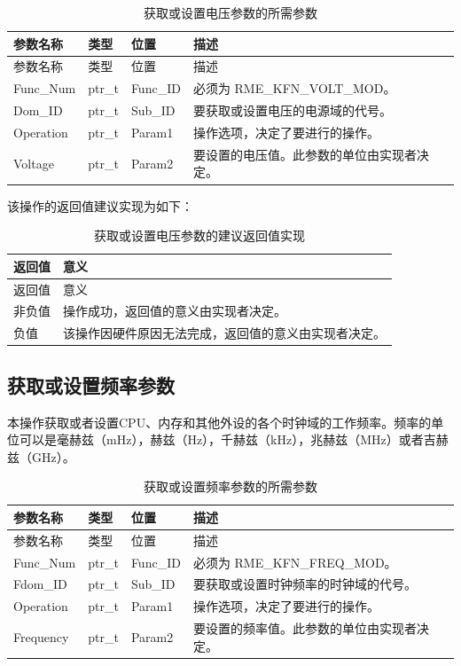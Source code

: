 \begin{xltabular}{\textwidth}{@{}>{\hsize\raggedright\arraybackslash}X>{\hsize\raggedright\arraybackslash}X>{\hsize\raggedright\arraybackslash}X>{\hsize\raggedright\arraybackslash}X@{}}
\caption{获取或设置电压参数的所需参数}\label{tab:8-49-get-or-set-voltage-parameters}\\
\toprule
参数名称 & 类型 & 位置 & 描述\tabularnewline
\endfirsthead
\toprule
参数名称 & 类型 & 位置 & 描述\tabularnewline
\midrule
\endhead
\bottomrule
\endlastfoot
Func\_Num & ptr\_t & Func\_ID & 必须为 RME\_KFN\_VOLT\_MOD。\tabularnewline
Dom\_ID & ptr\_t & Sub\_ID &
要获取或设置电压的电源域的代号。\tabularnewline
Operation & ptr\_t & Param1 &
操作选项，决定了要进行的操作。\tabularnewline
Voltage & ptr\_t & Param2 &
要设置的电压值。此参数的单位由实现者决定。\tabularnewline
\end{xltabular}

该操作的返回值建议实现为如下：

\begin{xltabular}{\textwidth}{@{}>{\hsize\raggedright\arraybackslash}X>{\hsize\raggedright\arraybackslash}X@{}}
\caption{获取或设置电压参数的建议返回值实现}\label{tab:8-50-get-or-set-voltage-suggested-return-values}\\
\toprule
返回值 & 意义\tabularnewline
\endfirsthead
\toprule
返回值 & 意义\tabularnewline
\midrule
\endhead
\bottomrule
\endlastfoot
    非负值 & 操作成功，返回值的意义由实现者决定。\tabularnewline
    负值 & 该操作因硬件原因无法完成，返回值的意义由实现者决定。\tabularnewline
\end{xltabular}

\subsection{获取或设置频率参数}\label{subsec:8-get-or-set-frequency}

本操作获取或者设置CPU、内存和其他外设的各个时钟域的工作频率。频率的单位可以是毫赫兹（mHz），赫兹（Hz），千赫兹（kHz），兆赫兹（MHz）或者吉赫兹（GHz）。

\begin{xltabular}{\textwidth}{@{}>{\hsize\raggedright\arraybackslash}X>{\hsize\raggedright\arraybackslash}X>{\hsize\raggedright\arraybackslash}X>{\hsize\raggedright\arraybackslash}X@{}}
\caption{获取或设置频率参数的所需参数}\label{tab:8-51-get-or-set-frequency-parameters}\\
\toprule
参数名称 & 类型 & 位置 & 描述\tabularnewline
\endfirsthead
\toprule
参数名称 & 类型 & 位置 & 描述\tabularnewline
\midrule
\endhead
\bottomrule
\endlastfoot
Func\_Num & ptr\_t & Func\_ID & 必须为 RME\_KFN\_FREQ\_MOD。\tabularnewline
Fdom\_ID & ptr\_t & Sub\_ID &
要获取或设置时钟频率的时钟域的代号。\tabularnewline
Operation & ptr\_t & Param1 &
操作选项，决定了要进行的操作。\tabularnewline
Frequency & ptr\_t & Param2 &
要设置的频率值。此参数的单位由实现者决定。\tabularnewline
\end{xltabular}

